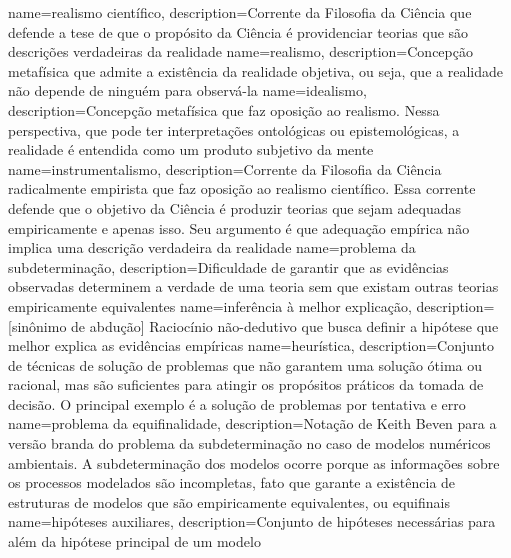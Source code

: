 {
    name=realismo científico,
    description={Corrente da Filosofia da Ciência que defende a tese de que o propósito da Ciência é providenciar teorias que são descrições verdadeiras da realidade}
}
{
    name=realismo,
    description={Concepção metafísica que admite a existência da realidade objetiva, ou seja, que a realidade não depende de ninguém para observá-la}
}
{
    name=idealismo,
    description={Concepção metafísica que faz oposição ao realismo. Nessa perspectiva, que pode ter interpretações ontológicas ou epistemológicas, a realidade é entendida como um produto subjetivo da mente}
}
{
    name=instrumentalismo,
    description={Corrente da Filosofia da Ciência radicalmente empirista que faz oposição ao realismo científico. Essa corrente defende que o objetivo da Ciência é produzir teorias que sejam adequadas empiricamente e apenas isso. Seu argumento é que adequação empírica não implica uma descrição verdadeira da realidade}
}
{
    name=problema da subdeterminação,
    description={Dificuldade de garantir que as evidências observadas determinem a verdade de uma teoria sem que existam outras teorias empiricamente equivalentes}
}
{
    name=inferência à melhor explicação,
    description={[sinônimo de abdução] Raciocínio não-dedutivo que busca definir a hipótese que melhor explica as evidências empíricas}
}
{
    name=heurística,
    description={Conjunto de técnicas de solução de problemas que não garantem uma solução ótima ou racional, mas são suficientes para atingir os propósitos práticos da tomada de decisão. O principal exemplo é a solução de problemas por tentativa e erro}
}
{
    name=problema da equifinalidade,
    description={Notação de Keith Beven para a versão branda do problema da subdeterminação no caso de modelos numéricos ambientais. A subdeterminação dos modelos ocorre porque as informações sobre os processos modelados são incompletas, fato que garante a existência de estruturas de modelos que são empiricamente equivalentes, ou equifinais}
}
{
    name=hipóteses auxiliares,
    description={Conjunto de hipóteses necessárias para além da hipótese principal de um modelo}
}
